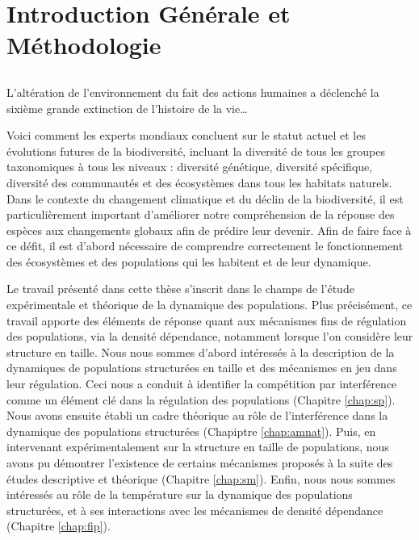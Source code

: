 \part{Introduction Générale et Méthodologie}

\chapter*[Introduction]{}

\vspace{-5cm}

\og L'altération de l'environnement du fait des actions
humaines a déclenché la sixième grande extinction de l'histoire de la vie\ldots\fg
\autocites{stuart-chapin-iii2000a}

Voici comment les experts mondiaux concluent sur le statut actuel et les
évolutions futures de la biodiversité, incluant la diversité de tous les groupes
taxonomiques à tous les niveaux : diversité génétique, diversité spécifique,
diversité des communautés et des écosystèmes dans tous les habitats naturels.
Dans le contexte du changement climatique et du déclin de la biodiversité, il
est particulièrement important d'améliorer notre compréhension de la réponse
des espèces aux changements globaux afin de prédire leur devenir. Afin de faire
face à ce défit, il est d'abord nécessaire de comprendre correctement le
fonctionnement des écosystèmes et des populations qui les habitent et de leur
dynamique. 

Le travail présenté dans cette thèse s'inscrit dans le champs de l'étude
expérimentale et théorique de la dynamique des populations. Plus précisément, ce
travail apporte des éléments de réponse quant aux mécanismes fins de régulation
des populations, via la densité dépendance, notamment lorsque l'on considère
leur structure en taille.
Nous nous sommes d'abord intéressés à la description de la dynamiques
de populations structurées en taille et des mécanismes en jeu dans leur
régulation. Ceci nous a conduit à identifier la compétition par interférence
comme un élément clé dans la régulation des populations (Chapitre
\ref{chap:sp}).
Nous avons ensuite établi un cadre théorique au rôle de l'interférence dans la
dynamique des populations structurées (Chapiptre \ref{chap:amnat}). Puis, en
intervenant expérimentalement sur la structure en taille de populations, nous avons pu démontrer 
l'existence de certains mécanismes proposés à la suite des études descriptive et
théorique (Chapitre \ref{chap:sm}).
Enfin, nous nous sommes intéressés au rôle de la température sur la dynamique
des populations structurées, et à ses interactions avec les mécanismes de densité
dépendance (Chapitre \ref{chap:fip}).





